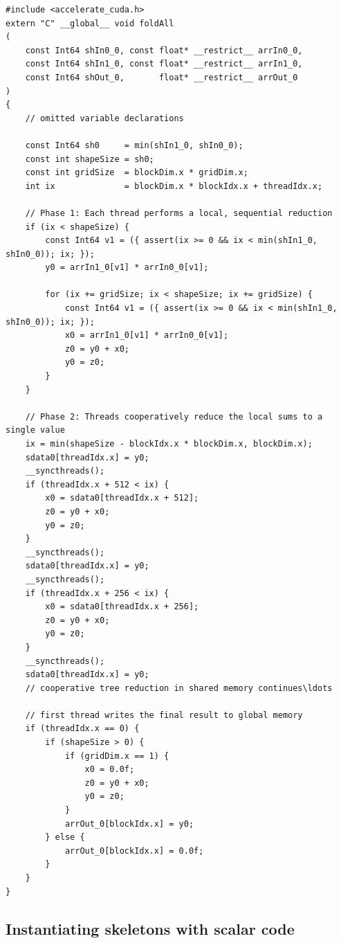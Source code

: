\begin{lstlisting}[style=cuda_float
    ,label=lst:dotp_generated
    ,caption={Generated CUDA code for the fused vector dot-product operation}]
#include <accelerate_cuda.h>
extern "C" __global__ void foldAll
(
    const Int64 shIn0_0, const float* __restrict__ arrIn0_0,
    const Int64 shIn1_0, const float* __restrict__ arrIn1_0,
    const Int64 shOut_0,       float* __restrict__ arrOut_0
)
{
    // omitted variable declarations

    const Int64 sh0     = min(shIn1_0, shIn0_0);
    const int shapeSize = sh0;
    const int gridSize  = blockDim.x * gridDim.x;
    int ix              = blockDim.x * blockIdx.x + threadIdx.x;

    // Phase 1: Each thread performs a local, sequential reduction
    if (ix < shapeSize) {
        const Int64 v1 = ({ assert(ix >= 0 && ix < min(shIn1_0, shIn0_0)); ix; });
        y0 = arrIn1_0[v1] * arrIn0_0[v1];

        for (ix += gridSize; ix < shapeSize; ix += gridSize) {
            const Int64 v1 = ({ assert(ix >= 0 && ix < min(shIn1_0, shIn0_0)); ix; });
            x0 = arrIn1_0[v1] * arrIn0_0[v1];
            z0 = y0 + x0;
            y0 = z0;
        }
    }

    // Phase 2: Threads cooperatively reduce the local sums to a single value
    ix = min(shapeSize - blockIdx.x * blockDim.x, blockDim.x);
    sdata0[threadIdx.x] = y0;
    __syncthreads();
    if (threadIdx.x + 512 < ix) {
        x0 = sdata0[threadIdx.x + 512];
        z0 = y0 + x0;
        y0 = z0;
    }
    __syncthreads();
    sdata0[threadIdx.x] = y0;
    __syncthreads();
    if (threadIdx.x + 256 < ix) {
        x0 = sdata0[threadIdx.x + 256];
        z0 = y0 + x0;
        y0 = z0;
    }
    __syncthreads();
    sdata0[threadIdx.x] = y0;
    // cooperative tree reduction in shared memory continues\ldots

    // first thread writes the final result to global memory
    if (threadIdx.x == 0) {
        if (shapeSize > 0) {
            if (gridDim.x == 1) {
                x0 = 0.0f;
                z0 = y0 + x0;
                y0 = z0;
            }
            arrOut_0[blockIdx.x] = y0;
        } else {
            arrOut_0[blockIdx.x] = 0.0f;
        }
    }
}
\end{lstlisting}


\subsection{Instantiating skeletons with scalar code}
\label{sec:instantiating_skeletons_with_scalar_code}

